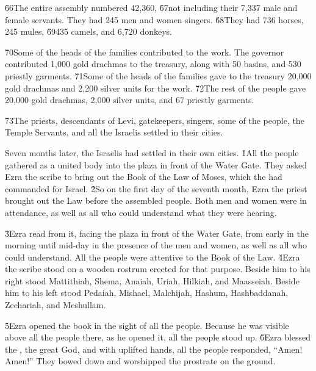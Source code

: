 \v{66}The entire assembly numbered 42,360, \v{67}not including their 7,337 male and female servants. They had 245 men and women singers. \v{68}They had 736 horses, 245 mules, \v{69}435 camels, and 6,720 donkeys.

\v{70}Some of the heads of the families contributed to the work. The governor contributed 1,000 gold drachmas to the treasury, along with 50 basins, and 530 priestly garments. \v{71}Some of the heads of the families gave to the treasury 20,000 gold drachmas and 2,200 silver units for the work. \v{72}The rest of the people gave 20,000 gold drachmas, 2,000 silver units, and 67 priestly garments.

\v{73}The priests, descendants of Levi, gatekeepers, singers, some of the people, the Temple Servants, and all the Israelis settled in their cities.

Seven months later, the Israelis had settled in their own cities.
\v{1}All the people gathered as a united body into the plaza in front of the Water Gate. They asked Ezra the scribe to bring out the Book of the Law of Moses, which the  had commanded for Israel. \v{2}So on the first day of the seventh month, Ezra the priest brought out the Law before the assembled people. Both men and women were in attendance, as well as all who could understand what they were hearing.

\v{3}Ezra read from it, facing the plaza in front of the Water Gate, from early in the morning until mid-day in the presence of the men and women, as well as all who could understand. All the people were attentive to the Book of the Law. \v{4}Ezra the scribe stood on a wooden rostrum erected for that purpose. Beside him to his right stood Mattithiah, Shema, Anaiah, Uriah, Hilkiah, and Maasseiah. Beside him to his left stood Pedaiah, Mishael, Malchijah, Hashum, Hashbaddanah, Zechariah, and Meshullam.

\v{5}Ezra opened the book in the sight of all the people. Because he was visible above all the people there, as he opened it, all the people stood up. \v{6}Ezra blessed the , the great God, and with uplifted hands, all the people responded, ``Amen! Amen!'' They bowed down and worshipped the  prostrate on the ground.

